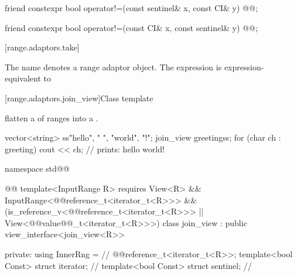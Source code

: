{%
\begin{itemdecl}
friend constexpr bool operator!=(const sentinel& x, const CI& y)
  @@;
\end{itemdecl}

\begin{itemdescr}
\pnum
\oldtxt{\returns} 
\end{itemdescr}

\begin{itemdecl}
friend constexpr bool operator!=(const CI& x, const sentinel& y)
  @@;
\end{itemdecl}

\begin{itemdescr}
\pnum
\oldtxt{\returns} 
\end{itemdescr}

[range.adaptors.take]{}

\pnum
The name  denotes a range adaptor
object.  The
expression   is expression-equivalent to 


[range.adaptors.join_view]{Class template }

\pnum
{}   flatten a
 of ranges into a
.

\pnum
\begin{example}
\begin{codeblock}
vector<string> ss{"hello", " ", "world", "!"};
join_view greeting{ss};
for (char ch : greeting)
  cout << ch; // prints: hello world!
\end{codeblock}
\end{example}

\begin{codeblock}
namespace std@@ { @@
  template<InputRange R>
    requires View<R> && InputRange<@@reference_t<iterator_t<R>>> &&
      (is_reference_v<@@reference_t<iterator_t<R>>> ||
      View<@@value@@_t<iterator_t<R>>>)
  class join_view : public view_interface<join_view<R>> {
  private:
    using InnerRng =              // \expos
      @@reference_t<iterator_t<R>>;
    template<bool Const>
      struct iterator;            // \expos
    template<bool Const>
      struct sentinel;            // \expos

}}
\end{codeblock}}
